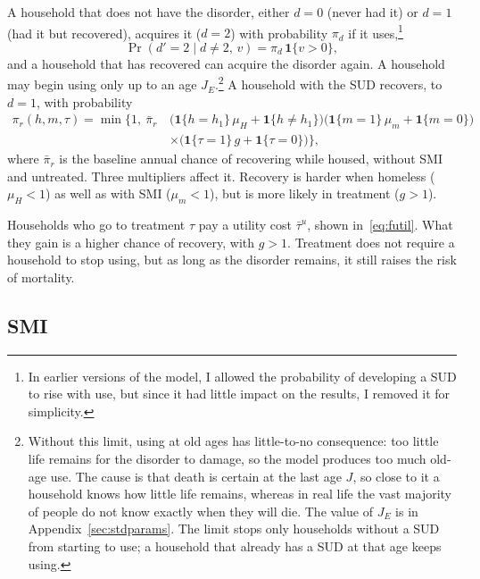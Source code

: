 \documentclass[10pt]{article}
\begin{document}
A household that does not have the disorder, either $d=0$ (never had it) or $d=1$ (had it
but recovered), acquires it ($d=2$) with probability $\pi_d$ if it uses,\footnote{In earlier versions of the model, I allowed the probability of developing a SUD to rise with use, but since it had little impact on the results, I removed it for simplicity.}
\begin{equation}\label{eq:fd}
\Pr(d'=2\mid d\neq 2,\,v)=\pi_d\,\mathbf{1}\{v>0\},
\end{equation}
and a household that has
recovered can acquire the disorder again. A household may begin using only up to an
age $J_E$.\footnote{\label{fn:je}Without this limit, using at old ages has little-to-no consequence: too
little life remains for the disorder to damage, so the model produces too much old-age use. The cause is that death is certain at the last age $J$, so close to it a household
knows how little life remains, whereas in real life the vast majority of people do not know exactly when they will die.
 The value of $J_E$ is in Appendix~\ref{sec:stdparams}.  The limit stops only households without a SUD from starting to use; a household that already has a SUD at that age keeps using.} A household with the SUD recovers, to $d=1$, with probability
\begin{equation}\label{eq:frecover}
\begin{aligned}
\pi_r(h,m,\tau)=\min\Big\{1,\ \bar\pi_r\,&\big(\mathbf{1}\{h=h_1\}\,\mu_H+\mathbf{1}\{h\neq h_1\}\big)\big(\mathbf{1}\{m=1\}\,\mu_m+\mathbf{1}\{m=0\}\big)\\
&\times\big(\mathbf{1}\{\tau=1\}\,g+\mathbf{1}\{\tau=0\}\big)\Big\},
\end{aligned}
\end{equation}
where $\bar\pi_r$ is the baseline annual chance of recovering while housed, without SMI and untreated.   Three multipliers affect it. Recovery is harder when homeless ($\mu_H<1$) as well as with SMI ($\mu_m<1$), but is more likely in treatment ($g>1$).

 Households who go to treatment $\tau$ pay a utility cost $\bar\tau^u$, shown in~\eqref{eq:futil}. What they gain is a higher chance of recovery, with $g>1$. Treatment does not require a household to stop using, but as long as the disorder remains, it still raises the risk of mortality.

\subsection{SMI}\label{sec:fsmi}
\end{document}

